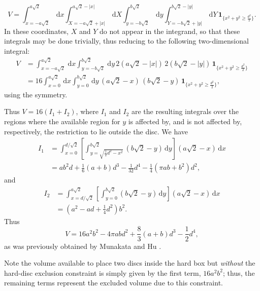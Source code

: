 \documentclass[a4paper,10pt]{article}
\newcommand{\rd}{\, \mathrm{d}}
\newcommand{\indicator}[1]{\mathbf{1}_{ \{   #1 \} } }
\begin{document}
\begin{equation}
 V = \int_{x=-a \sqrt{2}}^{a \sqrt{2}} \rd x 
\int_{X=-a \sqrt{2} + |x| }^{a \sqrt{2} - |x|}  \rd X
 \int_{y=-b \sqrt{2}}^{b \sqrt{2}} \rd y
\int_{Y=-b \sqrt{2} + |y| }^{b \sqrt{2}-|y|}  \rd Y
\, \indicator{ x^2 + y^2 \ge \frac{d^2}{2}  }.
\end{equation}
In these coordinates, $X$ and $Y$ do not appear in the integrand, so that these integrals may be done trivially, thus reducing to the following two-dimensional integral:
\begin{align}
 V &= \int_{x=-a \sqrt{2}}^{a \sqrt{2}} \rd x  \int_{y=-b \sqrt{2}}^{b \sqrt{2}} \rd y
\, 2 \left( a \sqrt{2} - |x| \right) \, 2 \left( b \sqrt{2} - |y| \right) \,  \indicator{ x^2 + y^2 \ge \frac{d^2}{2} } \\
&= 16 \int_{x=0}^{a \sqrt{2}} \rd x  \int_{y=0}^{b \sqrt{2}} \rd y
\, \left( a \sqrt{2} - x \right) \, \left( b \sqrt{2} - y \right) \,  \indicator{ x^2 + y^2 \ge \frac{d^2}{2} },
\end{align}
using the symmetry.

Thus $V = 16(I_1 + I_2)$, where $I_1$ and $I_2$ are the resulting integrals over the regions where the available region for $y$ is affected by, and is not affected by, respectively, the restriction to lie outside the disc.
We have
\begin{align}
 I_1 &= \int_{x=0}^{d / \sqrt{2}} \left[ \int_{y = \sqrt{\frac{1}{2} {d^2} - x^2}}^{b \sqrt{2}} \left( b \sqrt{2} - y \right) \rd y \right]  \left( a \sqrt{2} - x \right) \rd x \\
&= 	
a b^{2} d + \textstyle \frac{1}{6} (a+b) d^{3} - \frac{1}{32}  d^{4} - \frac{1}{4} {\left(\pi a b + b^{2}\right)} d^{2},
\end{align}
and
\begin{align}
 I_2 &= \int_{x=d / \sqrt{2}}^{a \sqrt{2}} \left[ \int_{y = 0}^{b \sqrt{2}} \left( b \sqrt{2} - y \right) \rd y \right]  \left( a \sqrt{2} - x \right) \rd x \\
&=	
{\left( a^{2} - a d + \textstyle \frac{1}{4}  d^{2}\right)} b^{2}.
\end{align}
Thus 
\begin{equation}\label{volumeabd}
 V %
= 16 a^{2} b^{2}  - 4 \pi a b d^{2} + \textstyle \frac{8}{3} (a+b) d^{3}  - \frac{1}{2} d^{4},
\end{equation}
as was previously obtained by Munakata and Hu \cite{Munakata02}.

Note the volume available to place two discs inside the hard box but \emph{without} the 
 hard-disc exclusion constraint is simply given by the first term, $16 a^2 b^2$; thus, the remaining terms represent the excluded volume due to this constraint.
\end{document}
